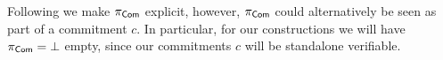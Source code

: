 \begin{remark}
Following \cite{TCC:KatLosXu20} we make $\pi_{\mathsf{Com}}$ explicit, however, $\pi_{\mathsf{Com}}$ could alternatively be seen as part of a commitment $c$. In particular, for our constructions we will have $\pi_{\mathsf{Com}} = \bot$ empty, since our commitments $c$ will be standalone verifiable.  
\end{remark}


